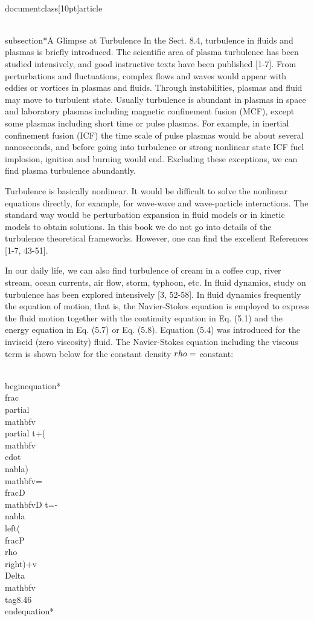 \\documentclass[10pt]{article}
\begin{document}
{{{{{\\subsection*{A Glimpse at Turbulence}
In the Sect. 8.4, turbulence in fluids and plasmas is briefly introduced. The scientific area of plasma turbulence has been studied intensively, and good instructive texts have been published [1-7]. From perturbations and fluctuations, complex flows and waves would appear with eddies or vortices in plasmas and fluids. Through instabilities, plasmas and fluid may move to turbulent state. Usually turbulence is abundant in plasmas in space and laboratory plasmas including magnetic confinement fusion (MCF), except some plasmas including short time or pulse plasmas. For example, in inertial confinement fusion (ICF) the time scale of pulse plasmas would be about several nanoseconds, and before going into turbulence or strong nonlinear state ICF fuel implosion, ignition and burning would end. Excluding these exceptions, we can find plasma turbulence abundantly.

Turbulence is basically nonlinear. It would be difficult to solve the nonlinear equations directly, for example, for wave-wave and wave-particle interactions. The standard way would be perturbation expansion in fluid models or in kinetic models to obtain solutions. In this book we do not go into details of the turbulence theoretical frameworks. However, one can find the excellent References [1-7, 43-51].

In our daily life, we can also find turbulence of cream in a coffee cup, river stream, ocean currents, air flow, storm, typhoon, etc. In fluid dynamics, study on turbulence has been explored intensively [3, 52-58]. In fluid dynamics frequently the equation of motion, that is, the Navier-Stokes equation is employed to express the fluid motion together with the continuity equation in Eq. (5.1) and the energy equation in Eq. (5.7)
or Eq. (5.8). Equation (5.4) was introduced for the inviscid (zero viscosity) fluid. The Navier-Stokes equation including the viscous term is shown below for the constant density $\\rho=$ constant:


\\begin{equation*}
\\frac{\\partial \\mathbf{v}}{\\partial t}+(\\mathbf{v} \\cdot \\nabla) \\mathbf{v}=\\frac{D \\mathbf{v}}{D t}=-\\nabla\\left(\\frac{P}{\\rho}\\right)+v \\Delta \\mathbf{v} \\tag{8.46}
\\end{equation*}


}}}}}
\end{document}
